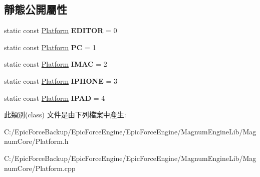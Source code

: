 \subsection*{靜態公開屬性}
\begin{DoxyCompactItemize}
\item 
static const \hyperlink{class_magnum_1_1_platform}{Platform} {\bfseries E\+D\+I\+T\+OR} = 0\hypertarget{class_magnum_1_1_platform_afcf8bc17d7e15bc2e0c08c78aed59956}{}\label{class_magnum_1_1_platform_afcf8bc17d7e15bc2e0c08c78aed59956}

\item 
static const \hyperlink{class_magnum_1_1_platform}{Platform} {\bfseries PC} = 1\hypertarget{class_magnum_1_1_platform_abe08aa08f99271d03fd6bcebf62f7685}{}\label{class_magnum_1_1_platform_abe08aa08f99271d03fd6bcebf62f7685}

\item 
static const \hyperlink{class_magnum_1_1_platform}{Platform} {\bfseries I\+M\+AC} = 2\hypertarget{class_magnum_1_1_platform_a31d667d95484ec2c2f88cef2fd1bc191}{}\label{class_magnum_1_1_platform_a31d667d95484ec2c2f88cef2fd1bc191}

\item 
static const \hyperlink{class_magnum_1_1_platform}{Platform} {\bfseries I\+P\+H\+O\+NE} = 3\hypertarget{class_magnum_1_1_platform_aff825eaa741a3bdda721cfb18efa657f}{}\label{class_magnum_1_1_platform_aff825eaa741a3bdda721cfb18efa657f}

\item 
static const \hyperlink{class_magnum_1_1_platform}{Platform} {\bfseries I\+P\+AD} = 4\hypertarget{class_magnum_1_1_platform_aea05cf2f886a77a639db36689c030fb5}{}\label{class_magnum_1_1_platform_aea05cf2f886a77a639db36689c030fb5}

\end{DoxyCompactItemize}


此類別(class) 文件是由下列檔案中產生\+:\begin{DoxyCompactItemize}
\item 
C\+:/\+Epic\+Force\+Backup/\+Epic\+Force\+Engine/\+Epic\+Force\+Engine/\+Magnum\+Engine\+Lib/\+Magnum\+Core/Platform.\+h\item 
C\+:/\+Epic\+Force\+Backup/\+Epic\+Force\+Engine/\+Epic\+Force\+Engine/\+Magnum\+Engine\+Lib/\+Magnum\+Core/Platform.\+cpp\end{DoxyCompactItemize}
